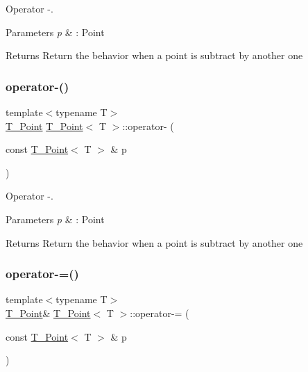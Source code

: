 Operator -\/. 


\begin{DoxyParams}{Parameters}
{\em p} & \+: Point \\
\hline
\end{DoxyParams}
\begin{DoxyReturn}{Returns}
Return the behavior when a point is subtract by another one 
\end{DoxyReturn}
\mbox{\label{classT__Point_a4a3671d0a9763b3e749c799294ebb1ca}} 
\subsubsection{\texorpdfstring{operator-\/()}{operator-()}\hspace{0.1cm}{\footnotesize\ttfamily [2/2]}}
{\footnotesize\ttfamily template$<$typename T$>$ \\
\hyperlink{classT__Point}{T\+\_\+\+Point} \hyperlink{classT__Point}{T\+\_\+\+Point}$<$ T $>$\+::operator-\/ (\begin{DoxyParamCaption}\item[{const \hyperlink{classT__Point}{T\+\_\+\+Point}$<$ T $>$ \&}]{p }\end{DoxyParamCaption})\hspace{0.3cm}{\ttfamily [inline]}}



Operator -\/. 


\begin{DoxyParams}{Parameters}
{\em p} & \+: Point \\
\hline
\end{DoxyParams}
\begin{DoxyReturn}{Returns}
Return the behavior when a point is subtract by another one 
\end{DoxyReturn}
\mbox{\label{classT__Point_aa438de3090999e1f24f0de58dc5171a0}} 
\subsubsection{\texorpdfstring{operator-\/=()}{operator-=()}\hspace{0.1cm}{\footnotesize\ttfamily [1/2]}}
{\footnotesize\ttfamily template$<$typename T$>$ \\
\hyperlink{classT__Point}{T\+\_\+\+Point}\& \hyperlink{classT__Point}{T\+\_\+\+Point}$<$ T $>$\+::operator-\/= (\begin{DoxyParamCaption}\item[{const \hyperlink{classT__Point}{T\+\_\+\+Point}$<$ T $>$ \&}]{p }\end{DoxyParamCaption})\hspace{0.3cm}{\ttfamily [inline]}}



